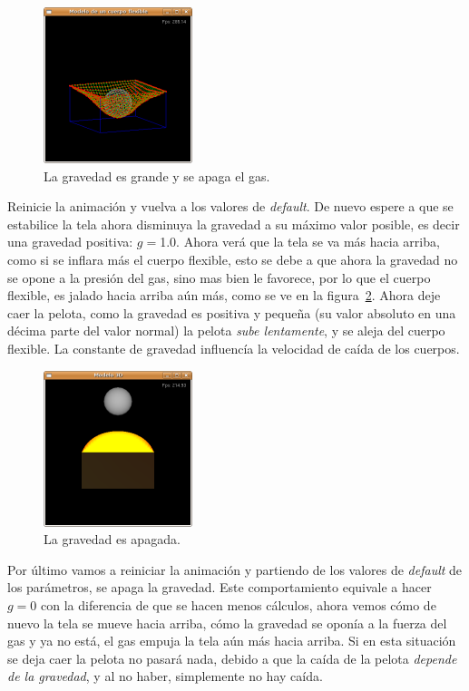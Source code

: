 \begin{figure}
 \centering
 \includegraphics[]{Img/modGra2}
 \caption[Ejecución con fuerza de gravedad grande y sin presión]{La gravedad es grande y se apaga el gas.}
 \label{grav:test2}
\end{figure}

Reinicie la animación y vuelva a los valores de \emph{\foreignlanguage{english}{default}}.
De nuevo espere a que se estabilice la tela ahora disminuya la gravedad a su máximo valor posible, es decir una gravedad positiva: $g=$1.0.
Ahora verá que la tela se va más hacia arriba, como si se inflara más el cuerpo flexible, esto se debe a que ahora la gravedad no se opone a la presión del gas, sino mas bien le favorece, por lo que el cuerpo flexible, es jalado hacia arriba aún más, como se ve en la figura~\ref{grav:test3}.
Ahora deje caer la pelota, como la gravedad es positiva y pequeña (su valor absoluto en una décima parte del valor normal) la pelota \emph{sube lentamente}, y se aleja del cuerpo flexible.
La constante de gravedad influencía la velocidad de caída de los cuerpos.

\begin{figure}
 \centering
 \includegraphics[]{Img/modGra3}
 \caption[Ejecución con la fuerza de gravedad apagada]{La gravedad es apagada.}
 \label{grav:test3}
\end{figure}

Por último vamos a reiniciar la animación y partiendo de los valores de \emph{\foreignlanguage{english}{default}} de los parámetros, se apaga la gravedad. 
Este comportamiento equivale a hacer $g=0$ con la diferencia de que se hacen menos cálculos, ahora vemos cómo de nuevo la tela se mueve hacia arriba, cómo la gravedad se oponía a la fuerza del gas y ya no está, el gas empuja la tela aún más hacia arriba.
Si en esta situación se deja caer la pelota no pasará nada, debido a que la caída de la pelota \emph{depende de la gravedad}, y al no haber, simplemente no hay caída.

